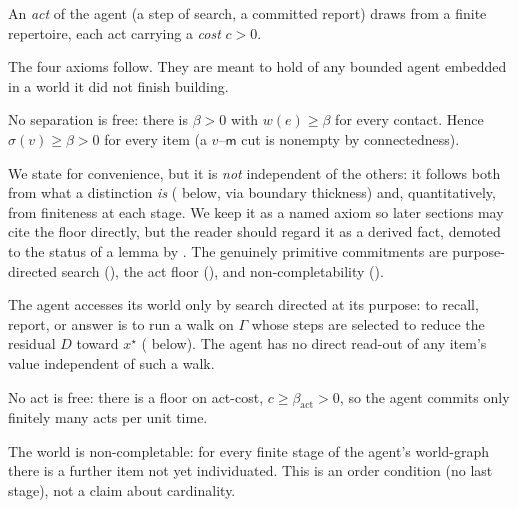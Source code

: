 \documentclass[11pt,twocolumn,a4paper]{article}
\newcommand{\Gph}{\Gamma}
\newcommand{\wt}{w}
\newcommand{\med}{\mathsf{m}}
\newcommand{\flo}{\beta}
\newcommand{\str}{\sigma}
\newcommand{\Purp}{x^{\star}}
\newcommand{\cost}{c}
\newcommand{\dem}{D}
\begin{document}
\begin{definition}
\label{def:act}
An \emph{act} of the agent (a step of search, a committed report) draws from
a finite repertoire, each act carrying a \emph{cost} $\cost>0$.
\end{definition}

The four axioms follow. They are meant to hold of any bounded agent
embedded in a world it did not finish building.

\begin{axiom}
\label{ax:distfloor}
No separation is free: there is $\flo>0$ with $\wt(e)\ge\flo$ for every
contact. Hence $\str(v)\ge\flo>0$ for every item (a $v$--$\med$ cut is
nonempty by connectedness).
\end{axiom}

\begin{remark}
\label{rem:floor-not-independent}
We state  for convenience, but it is \emph{not}
independent of the others: it follows both from what a distinction
\emph{is} ( below, via boundary thickness) and,
quantitatively, from finiteness at each stage. We keep it as a named axiom
so later sections may cite the floor directly, but the reader should regard
it as a derived fact, demoted to the status of a lemma by
. The genuinely primitive commitments are
purpose-directed search (), the act floor
(), and non-completability ().
\end{remark}

\begin{axiom}
\label{ax:purpsearch}
The agent accesses its world only by search directed at its purpose: to
recall, report, or answer is to run a walk on $\Gph$ whose steps are
selected to reduce the residual $\dem$ toward $\Purp$
( below). The agent has no direct read-out of any
item's value independent of such a walk.
\end{axiom}

\begin{axiom}
\label{ax:actfloor}
No act is free: there is a floor on act-cost, $\cost\ge\flo_{\mathrm{act}}
>0$, so the agent commits only finitely many acts per unit time.
\end{axiom}

\begin{axiom}
\label{ax:noncompletable}
The world is non-completable: for every finite stage of the agent's
world-graph there is a further item not yet individuated. This is an order
condition (no last stage), not a claim about cardinality.
\end{axiom}
\end{document}
